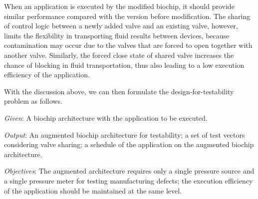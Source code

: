 When an application is executed by the modified biochip, 
it should provide similar performance compared with the version before
modification.  The sharing of control logic between a newly added valve and an
existing valve, however, limits the flexibility in transporting fluid results
between devices, because contamination may occur due to the valves that
are forced to open together with another valve. Similarly, the forced close state of
shared valve increases the chance of blocking in fluid transportation, thus
also leading to a low execution efficiency of the application.

With the discussion above, we can then formulate the design-for-testability
problem as follows.

\noindent\textit{Given}: A biochip architecture with the application to be
executed.

\noindent\textit{Output}: An augmented biochip architecture for testability; a set of test
vectors considering valve sharing; a schedule of the application on the
augmented biochip architecture.

\noindent\textit{Objectives}: The augmented architecture requires only a
single pressure source and a single pressure meter for testing 
manufacturing defects; the execution efficiency of the application should be
maintained at the same level.


